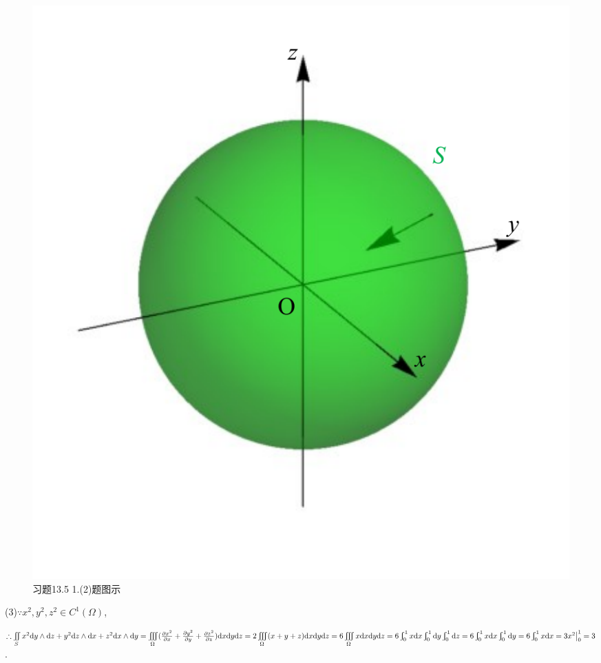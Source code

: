 \documentclass[12pt,UTF8,fleqn]{ctexart}
\newcommand{\Int}[4]{\varint\nolimits_{#1}^{#2}#3\mathrm d#4}
\newcommand{\varIIInt}[5]{\iiint\limits_{#1}#2\mathrm d#3\mathrm d#4\mathrm d#5}
\newcommand{\md}[1]{\mathrm d#1}
\newcommand{\BSIInt}[2]{\iint\limits_{#1}#2}
\newcommand{\pp}[2]{\frac{\partial #1}{\partial #2}}
\begin{document}
\begin{enumerate}
\begin{figure}[H]
\begin{center}
\includegraphics[height=0.5\textheight]{Figures24/Fig13-5-1-2.pdf}
\end{center}
\caption{习题13.5 1.(2)题图示}
\label{13-5-1-2}
\end{figure}

(3)$\because x^2,y^2,z^2\in C^1(\Omega)$,

$\therefore\BSIInt S{x^2\md y\wedge\md z+y^2\md z\wedge\md x+z^2\md x\wedge\md y}=\varIIInt\Omega{(\pp{x^2}x+\pp{y^2}y+\pp{z^2}z)}xyz\\
=2\varIIInt\Omega{(x+y+z)}xyz=6\varIIInt\Omega xxyz=6\Int01xx\Int01{}y\Int01{}z=6\Int01xx\Int01{}y\\
=6\Int01xx=3x^2\big|_0^1=3$.


\end{enumerate}
\end{document}
